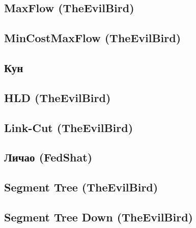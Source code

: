 \documentclass[a4paper]{article}
\begin{document}
\begin{multicols*}{2}
        \subsection{MaxFlow (TheEvilBird)}
            
                
        \subsection{MinCostMaxFlow (TheEvilBird)}
            
            
        \subsection{Кун}
            
        
        \subsection{HLD (TheEvilBird)}
            

        \subsection{Link-Cut (TheEvilBird)}
            
        
        \subsection{Личао (FedShat)}
            
            
        \subsection{Segment Tree (TheEvilBird)}
            
        
        \subsection{Segment Tree Down (TheEvilBird)}
            
        

\end{multicols*}
\end{document}
